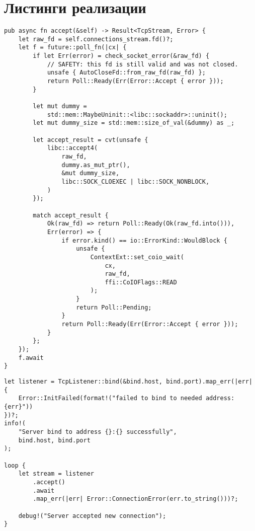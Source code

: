 \documentclass[times,numbers=noenddot]{itmo-student-thesis}
\begin{document}
\appendix

\chapter{Листинги реализации}\label{sec:app:1}

\begin{lstlisting}[float=!h,caption={Реализация ключевого метода accept},label={lst1}]
pub async fn accept(&self) -> Result<TcpStream, Error> {
    let raw_fd = self.connections_stream.fd()?;
    let f = future::poll_fn(|cx| {
        if let Err(error) = check_socket_error(&raw_fd) {
            // SAFETY: this fd is still valid and was not closed.
            unsafe { AutoCloseFd::from_raw_fd(raw_fd) };
            return Poll::Ready(Err(Error::Accept { error }));
        }

        let mut dummy =
            std::mem::MaybeUninit::<libc::sockaddr>::uninit();
        let mut dummy_size = std::mem::size_of_val(&dummy) as _;

        let accept_result = cvt(unsafe {
            libc::accept4(
                raw_fd,
                dummy.as_mut_ptr(),
                &mut dummy_size,
                libc::SOCK_CLOEXEC | libc::SOCK_NONBLOCK,
            )
        });

        match accept_result {
            Ok(raw_fd) => return Poll::Ready(Ok(raw_fd.into())),
            Err(error) => {
                if error.kind() == io::ErrorKind::WouldBlock {
                    unsafe {
                        ContextExt::set_coio_wait(
                            cx,
                            raw_fd,
                            ffi::CoIOFlags::READ
                        );
                    }
                    return Poll::Pending;
                }
                return Poll::Ready(Err(Error::Accept { error }));
            }
        };
    });
    f.await
}
\end{lstlisting}

\begin{lstlisting}[float=!h,caption={Главный цикл веб-сервера},label={lst2}]
let listener = TcpListener::bind(&bind.host, bind.port).map_err(|err| {
    Error::InitFailed(format!("failed to bind to needed address: {err}"))
})?;
info!(
    "Server bind to address {}:{} successfully",
    bind.host, bind.port
);

loop {
    let stream = listener
        .accept()
        .await
        .map_err(|err| Error::ConnectionError(err.to_string()))?;

    debug!("Server accepted new connection");
}
\end{lstlisting}
\end{document}
